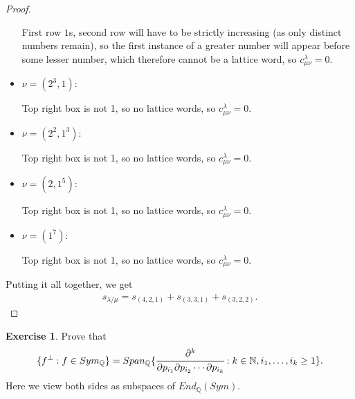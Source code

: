 \documentclass[8pt]{extarticle}
\newcommand{\set}[1]{\{#1\}}
\newcommand{\N}{\mathbb{N}}
\newcommand{\Q}{\mathbb{Q}}
\newcommand{\<}{\langle}
\renewcommand{\>}{\rangle}
\theoremstyle{definition}
\newtheorem{exercise}{Exercise}
\begin{document}
\begin{proof}
\begin{itemize}
    First row $1$s, second row will have to be strictly increasing (as only distinct numbers remain), so the first instance of a greater number will appear before some lesser number, which therefore cannot be a lattice word, so $c_{\mu \nu}^{\lambda} = 0$.
    
  \item 
    $\nu = (2^3,1)$:

    Top right box is not 1, so no lattice words, so $c_{\mu \nu}^{\lambda} = 0 $.
  \item 
    $\nu = (2^2,1^3)$:

    Top right box is not 1, so no lattice words, so $c_{\mu \nu}^{\lambda} = 0 $.   
    
  \item 
    $\nu = (2,1^5)$:

    Top right box is not 1, so no lattice words, so $c_{\mu \nu}^{\lambda} = 0 $.   
  \item 
    $\nu = (1^7)$:

    Top right box is not 1, so no lattice words, so $c_{\mu \nu}^{\lambda} = 0 $.    
  \end{itemize}

  Putting it all together, we get
  \begin{align*}
    s_{\lambda/\mu} = s_{(4,2,1)} + s_{(3,3,1)} + s_{(3,2,2)}.
  \end{align*}
\end{proof}

\begin{exercise}
  Prove that
  \begin{align*}
    \set{f^{\perp} : f \in Sym_\Q} = Span_{\Q}\set{\cfrac{\partial^k}{\partial p_{i_1} \partial p_{i_2} \cdots \partial p_{i_k}} : k \in \N, i_1, \dots, i_k \geq 1 }.
  \end{align*}
  Here we view both sides as subspaces of $End_{\Q}(Sym)$.
\end{exercise}
\end{document}
